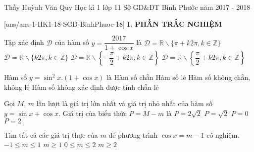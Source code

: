 	\begin{name}
		{Thầy Huỳnh Văn Quy}
		{Học kì 1 lớp 11 Sở GD\&ĐT Bình Phước năm 2017 - 2018}
	\end{name}
	\setcounter{ex}{0}\setcounter{bt}{0}
	[ans/ans-1-HK1-18-SGD-BinhPhuoc-18]
\noindent\textbf{I. PHẦN TRẮC NGHIỆM}
\begin{ex}%
	Tập xác định $\mathscr{D}$ của hàm số $y=\dfrac{2017}{1+\cos x}$ là
	\choice
	{\True $\mathscr{D}=\mathbb{R}\backslash \{\pi+k2\pi,k\in \mathbb{Z}\}$}
	{$\mathscr{D}=\mathbb{R}\backslash \{k2\pi,k\in \mathbb{Z}\}$}
	{$\mathscr{D}=\mathbb{R}\backslash \left\{-\dfrac{\pi}{2}+k2\pi,k\in \mathbb{Z}\right\}$}
	{$\mathscr{D}=\mathbb{R}\backslash \left\{\dfrac{\pi}{2}+k2\pi,k\in \mathbb{Z}\right\}$}
\end{ex}
\begin{ex}%
	Hàm số $y=\sin^2x.(1+\cos x)$ là
	\choice
	{\True Hàm số chẵn}
	{Hàm số lẻ}
	{Hàm số không chẵn, không lẻ}
	{Hàm số không xác định được tính chẵn lẻ}
\end{ex}
\begin{ex}%
	Gọi $M$, $m$ lần lượt là giá trị lớn nhất và giá trị nhỏ nhất của hàm số $y=\sin x+\cos x$. Giá trị của biểu thức $P=M-m$ là
	\choice
	{\True $P=2\sqrt{2}$}
	{$P=\sqrt{2}$}
	{$P=0$}
	{$P=2$}
\end{ex}
\begin{ex}%
	Tìm tất cả các giá trị thực của $m$ để phương trình $\cos x=m-1$ có nghiệm.
	\choice
	{$-1\le m\le 1$}
	{$m\ge 1$}
	{\True $0\le m\le 2$}
	{$m\ge 2$}
\end{ex}
